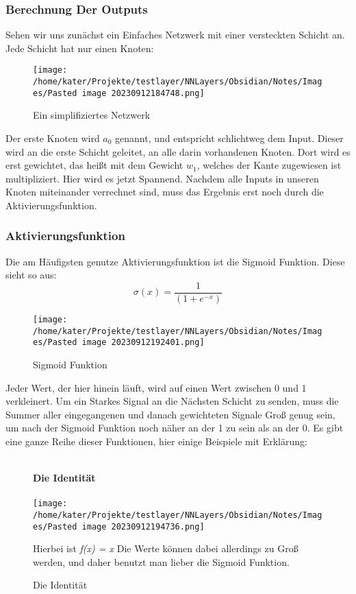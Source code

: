 \documentclass[12pt]{article}
\begin{document}
\subsubsection{Berechnung Der Outputs}
Sehen wir uns zunächst ein Einfaches Netzwerk mit einer versteckten Schicht an. Jede Schicht hat nur einen Knoten:
\begin{figure}[htp]
\centering
\texttt{[image: /home/kater/Projekte/testlayer/NNLayers/Obsidian/Notes/Images/Pasted image 20230912184748.png]}
\caption{Ein simplifiziertes Netzwerk}
\label{Was kommt hier rein?}
\end{figure}

Der erste Knoten wird \(a_0\) genannt, und entspricht schlichtweg dem Input. Dieser wird an die erste Schicht geleitet, an alle darin vorhandenen Knoten. Dort wird es erst gewichtet, das heißt mit dem Gewicht \(w_1\), welches der Kante zugewiesen ist multipliziert. Hier wird es jetzt Spannend. Nachdem alle Inputs in unseren Knoten miteinander verrechnet sind, muss das Ergebnis erst noch durch die Aktivierungsfunktion.

\subsubsection{Aktivierungsfunktion}
Die am Häufigsten genutze Aktivierungsfunktion ist die Sigmoid Funktion. Diese sieht so aus:
\[
\sigma (x) = \frac{ 1 }{ (1+e^{ -x }) }
\]

\begin{figure}[htp]
\centering
\texttt{[image: /home/kater/Projekte/testlayer/NNLayers/Obsidian/Notes/Images/Pasted image 20230912192401.png]}
\caption{Sigmoid Funktion}
\label{Was kommt hier rein?}
\end{figure}

Jeder Wert, der hier hinein läuft, wird auf einen Wert zwischen 0 und 1 verkleinert. 
Um ein Starkes Signal an die Nächsten Schicht zu senden, muss die Summer aller eingegangenen und danach gewichteten Signale Groß genug sein, um nach der Sigmoid Funktion noch näher an der 1 zu sein als an der 0. 
Es gibt eine ganze Reihe dieser Funktionen, hier einige Beispiele mit Erklärung:
\\\\


\begin{figure}[H]
\textbf{Die Identität}\\\\
\centering
\texttt{[image: /home/kater/Projekte/testlayer/NNLayers/Obsidian/Notes/Images/Pasted image 20230912194736.png]}
\caption{Die Identität}
\label{Was kommt hier rein?}

Hierbei ist \emph{f(x) = x} Die Werte können dabei allerdings zu Groß werden, und daher benutzt man lieber die Sigmoid Funktion.

\end{figure}
\end{document}
